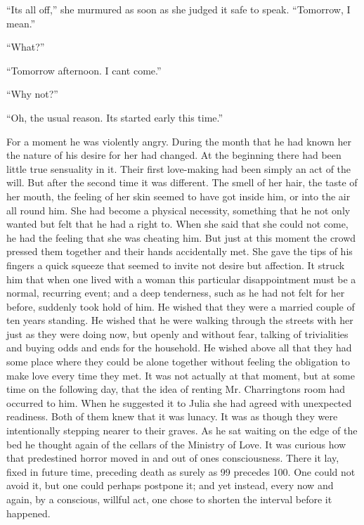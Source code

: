 ``It\textquotesingle s all off,'' she murmured as soon as she judged it
safe to speak. ``Tomorrow, I mean.''

``What?''

``Tomorrow afternoon. I can\textquotesingle t come.''

``Why not?''

``Oh, the usual reason. It\textquotesingle s started early this time.''

For a moment he was violently angry. During the month that he had known
her the nature of his desire for her had changed. At the beginning there
had been little true sensuality in it. Their first love-making had been
simply an act of the will. But after the second time it was different.
The smell of her hair, the taste of her mouth, the feeling of her skin
seemed to have got inside him, or into the air all round him. She had
become a physical necessity, something that he not only wanted but felt
that he had a right to. When she said that she could not come, he had
the feeling that she was cheating him. But just at this moment the crowd
pressed them together and their hands accidentally met. She gave the
tips of his fingers a quick squeeze that seemed to invite not desire but
affection. It struck him that when one lived with a woman this
particular disappointment must be a normal, recurring event; and a deep
tenderness, such as he had not felt for her before, suddenly took hold
of him. He wished that they were a married couple of ten
years\textquotesingle{} standing. He wished that he were walking through
the streets with her just as they were doing now, but openly and without
fear, talking of trivialities and buying odds and ends for the
household. He wished above all that they had some place where they could
be alone together without feeling the obligation to make love every time
they met. It was not actually at that moment, but at some time on the
following day, that the idea of renting Mr.
Charrington\textquotesingle s room had occurred to him. When he
suggested it to Julia she had agreed with unexpected readiness. Both of
them knew that it was lunacy. It was as though they were intentionally
stepping nearer to their graves. As he sat waiting on the edge of the
bed he thought again of the cellars of the Ministry of Love. It was
curious how that predestined horror moved in and out of
one\textquotesingle s consciousness. There it lay, fixed in future time,
preceding death as surely as 99 precedes 100. One could not avoid it,
but one could perhaps postpone it; and yet instead, every now and again,
by a conscious, willful act, one chose to shorten the interval before it
happened.


